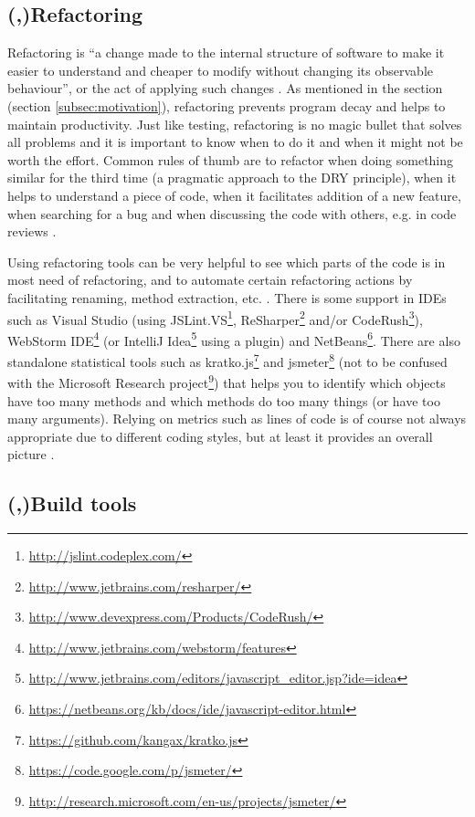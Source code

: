 \documentclass[11pt]{article}
\begin{document}
\subsection{(,)Refactoring}
\label{subsec:refactor}

Refactoring is ``a change made to the internal structure of software to make it easier to understand and cheaper to modify without changing its observable behaviour'', or the act of applying such changes \cite[p.~46]{Refactoring}. As mentioned in the  section (section \ref{subsec:motivation}), refactoring prevents program decay and helps to maintain productivity. Just like testing, refactoring is no magic bullet that solves all problems and it is important to know when to do it and when it might not be worth the effort. Common rules of thumb are to refactor when doing something similar for the third time (a pragmatic approach to the DRY principle), when it helps to understand a piece of code, when it facilitates addition of a new feature, when searching for a bug and when discussing the code with others, e.g. in code reviews \cite[p.~49-51]{Refactoring}.

Using refactoring tools can be very helpful to see which parts of the code is in most need of refactoring, and to automate certain refactoring actions by facilitating renaming, method extraction, etc. \cite[ch.~5]{Legacy}. There is some support in IDEs such as Visual Studio (using
JSLint.VS\footnote{\url{http://jslint.codeplex.com/}},
ReSharper\footnote{\url{http://www.jetbrains.com/resharper/}} and/or
CodeRush\footnote{\url{http://www.devexpress.com/Products/CodeRush/}}),
WebStorm IDE\footnote{\url{http://www.jetbrains.com/webstorm/features}} (or
IntelliJ Idea\footnote{\url{http://www.jetbrains.com/editors/javascript_editor.jsp?ide=idea}} using a plugin) and
NetBeans\footnote{\url{https://netbeans.org/kb/docs/ide/javascript-editor.html}}. There are also standalone statistical tools such as
kratko.js\footnote{\url{https://github.com/kangax/kratko.js}} and
jsmeter\footnote{\url{https://code.google.com/p/jsmeter/}} (not to be confused with the
Microsoft Research project\footnote{\url{http://research.microsoft.com/en-us/projects/jsmeter/}}) that helps you to identify which objects have too many methods and which methods do too many things (or have too many arguments). Relying on metrics such as lines of code is of course not always appropriate due to different coding styles, but at least it provides an overall picture \cite{Kratko}.

\subsection{(,)Build tools}
\label{subsec:build}
\end{document}
